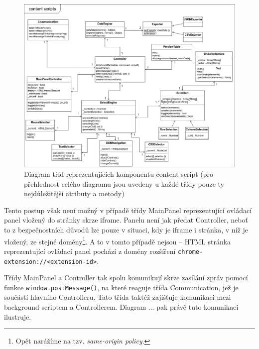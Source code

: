 \documentclass[thesis=B,czech]{FITthesis}[2012/06/26]
\begin{document}
\begin{figure}
	\includegraphics[width=\linewidth]{images/content_scripts_class_diagram.png}
	\caption[Diagram tříd reprezentujících komponentu content script]{Diagram tříd reprezentujících komponentu content script (pro přehlednost celého diagramu jsou uvedeny u každé třídy pouze ty nejdůležitější atributy a metody)}
	\label{fig:content_scripts_diagram}
\end{figure}

Tento postup však není možný v případě třídy MainPanel reprezentující ovládací panel vložený do stránky skrze iframe. Panelu není jak předat Controller, neboť to z bezpečnostních důvodů lze pouze v situaci, kdy je iframe i stránka, v níž je vložený, ze stejné domény\footnote{Opět narážíme na tzv. \emph{same-origin policy}.}. A to v tomto případě nejsou -- HTML stránka reprezentující ovládací panel pochází z domény rozšíření \verb|chrome-extension://<extension-id>|. 

Třídy MainPanel a Controller tak spolu komunikují skrze zasílání zpráv pomocí funkce \verb|window.postMessage()|, na které reaguje třída Communication, jež je součástí hlavního Controlleru. Tato třída taktéž zajišťuje komunikaci mezi background scriptem a Controllerem. Diagram ... pak právě tuto komunikaci ilustruje.
\end{document}
